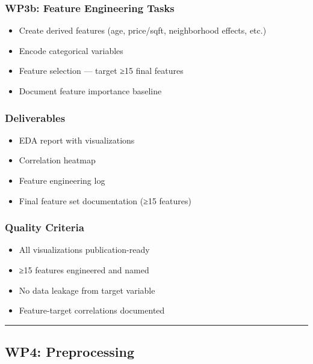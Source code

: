 \documentclass[
  english,
  letterpaper,
  DIV=11,
  numbers=noendperiod]{scrreprt}
\providecommand{\tightlist}{%
  \setlength{\itemsep}{0pt}\setlength{\parskip}{0pt}}
\begin{document}
\subsubsection{WP3b: Feature Engineering
Tasks}\label{wp3b-feature-engineering-tasks}

\begin{itemize}
\tightlist
\item
  Create derived features (age, price/sqft, neighborhood effects, etc.)
\item
  Encode categorical variables
\item
  Feature selection --- target ≥15 final features
\item
  Document feature importance baseline
\end{itemize}

\subsubsection{Deliverables}\label{deliverables-3}

\begin{itemize}
\tightlist
\item
  EDA report with visualizations
\item
  Correlation heatmap
\item
  Feature engineering log
\item
  Final feature set documentation (≥15 features)
\end{itemize}

\subsubsection{Quality Criteria}\label{quality-criteria-2}

\begin{itemize}
\tightlist
\item[$\square$]
  All visualizations publication-ready
\item[$\square$]
  ≥15 features engineered and named
\item[$\square$]
  No data leakage from target variable
\item[$\square$]
  Feature-target correlations documented
\end{itemize}

\begin{center}\rule{0.5\linewidth}{0.5pt}\end{center}

\subsection{WP4: Preprocessing}\label{wp4-preprocessing}
\end{document}
